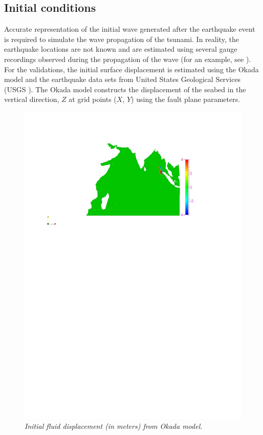 \subsection{Initial conditions}
Accurate representation of the initial wave generated after the earthquake event is required to simulate the wave propagation of the tsunami. In reality, the earthquake locations are not known and are estimated using several gauge recordings observed during the propagation of the wave (for an example,  see \cite{percival2011extraction}). For the validations, the initial surface displacement is estimated using the Okada model \cite{okada1992internal} and the earthquake data sets from United States Geological Services (USGS \cite{usgs}). The Okada model constructs the displacement of the seabed in the vertical direction, $Z$ at grid points ($X$, $Y$) using the fault plane parameters.




\begin{figure}[h!]
\begin{center}
\centering
\includegraphics[trim=6cm 19.55cm 4.5cm 3cm,clip=true,width=0.5\linewidth]{./figures/IndianOceanINC.pdf}
\caption{\emph{Initial fluid displacement (in meters) from Okada model.}}
\label{fig:indian_ocean_inc}
\end{center}
\end{figure}

